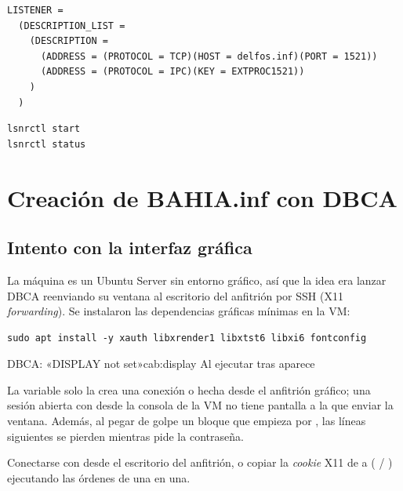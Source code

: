 \begin{lstlisting}[style=fichero,caption={\texttt{\$ORACLE\_HOME/network/admin/listener.ora}}]
LISTENER =
  (DESCRIPTION_LIST =
    (DESCRIPTION =
      (ADDRESS = (PROTOCOL = TCP)(HOST = delfos.inf)(PORT = 1521))
      (ADDRESS = (PROTOCOL = IPC)(KEY = EXTPROC1521))
    )
  )
\end{lstlisting}

\begin{lstlisting}[style=bash]
lsnrctl start
lsnrctl status
\end{lstlisting}


\section{Creación de BAHIA.inf con DBCA}
\label{sec:dbca}

\subsection{Intento con la interfaz gráfica}

La máquina es un Ubuntu Server sin entorno gráfico, así que la idea era lanzar
DBCA reenviando su ventana al escritorio del anfitrión por SSH (X11
\emph{forwarding}). Se instalaron las dependencias gráficas mínimas en la VM:

\begin{lstlisting}[style=bash]
sudo apt install -y xauth libxrender1 libxtst6 libxi6 fontconfig
\end{lstlisting}


\begin{cabezazo}{DBCA: «DISPLAY not set»}{cab:display}
\problema Al ejecutar  tras  aparece

\causa La variable  solo la crea una conexión  o
 hecha desde el anfitrión gráfico; una sesión abierta con
 desde la consola de la VM no tiene pantalla a la que enviar la
ventana. Además, al pegar de golpe un bloque que empieza por
, las líneas siguientes se pierden mientras 
pide la contraseña.

\solucion Conectarse con  desde el escritorio
del anfitrión, o copiar la \emph{cookie} X11 de  a 
( / ) ejecutando las órdenes de una
en una.
\end{cabezazo}

